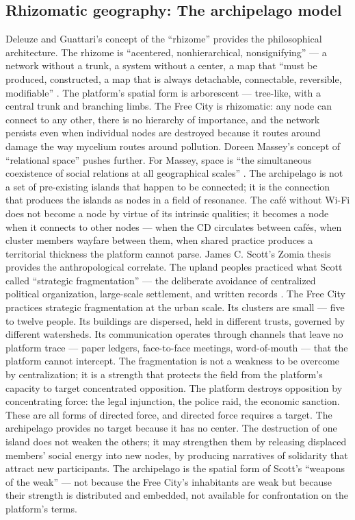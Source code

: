 \subsection{Rhizomatic geography: The archipelago model}

Deleuze and Guattari’s concept of the “rhizome” provides the philosophical architecture. The rhizome is “acentered, nonhierarchical, nonsignifying” — a network without a trunk, a system without a center, a map that “must be produced, constructed, a map that is always detachable, connectable, reversible, modifiable” \cite[pp.~7--21]{deleuze_guattari_1987}. The platform’s spatial form is arborescent — tree-like, with a central trunk and branching limbs. The Free City is rhizomatic: any node can connect to any other, there is no hierarchy of importance, and the network persists even when individual nodes are destroyed because it routes around damage the way mycelium routes around pollution. Doreen Massey’s concept of “relational space” pushes further. For Massey, space is “the simultaneous coexistence of social relations at all geographical scales” \cite[pp.~55-- 62]{massey_2005}. The archipelago is not a set of pre-existing islands that happen to be connected; it is the connection that produces the islands as nodes in a field of resonance. The café without Wi-Fi does not become a node by virtue of its intrinsic qualities; it becomes a node when it connects to other nodes — when the CD circulates between cafés, when cluster members wayfare between them, when shared practice produces a territorial thickness the platform cannot parse. James C. Scott’s Zomia thesis provides the anthropological correlate. The upland peoples practiced what Scott called “strategic fragmentation” — the deliberate avoidance of centralized political organization, large-scale settlement, and written records \cite[pp.~8--39]{scott_2009}. The Free City practices strategic fragmentation at the urban scale. Its clusters are small — five to twelve people. Its buildings are dispersed, held in different trusts, governed by different watersheds. Its communication operates through channels that leave no platform trace — paper ledgers, face-to-face meetings, word-of-mouth — that the platform cannot intercept. The fragmentation is not a weakness to be overcome by centralization; it is a strength that protects the field from the platform’s capacity to target concentrated opposition. The platform destroys opposition by concentrating force: the legal injunction, the police raid, the economic sanction. These are all forms of directed force, and directed force requires a target. The archipelago provides no target because it has no center. The destruction of one island does not weaken the others; it may strengthen them by releasing displaced members’ social energy into new nodes, by producing narratives of solidarity that attract new participants. The archipelago is the spatial form of Scott’s “weapons of the weak” — not because the Free City’s inhabitants are weak but because their strength is distributed and embedded, not available for confrontation on the platform’s terms.

